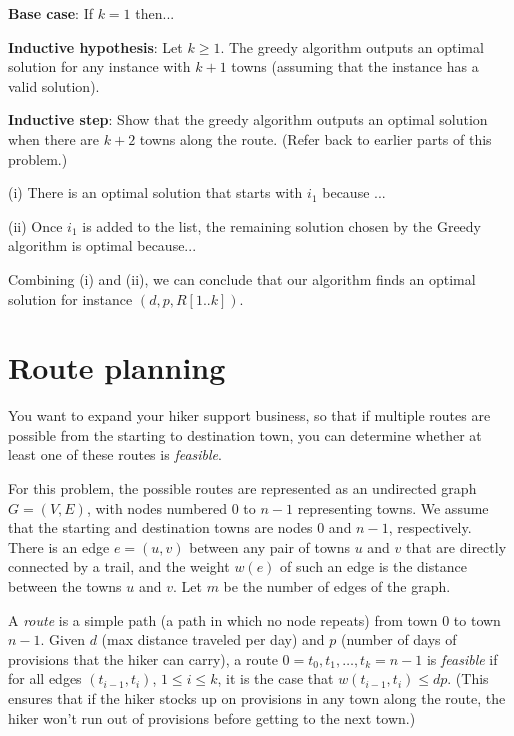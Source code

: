 \documentclass[11pt,fleqn]{exam}
\begin{document}
\begin{questions}
\noindent
{\bf Base case}: If $k = 1$ then...

\noindent
{\bf Inductive hypothesis}: Let $k\ge 1$.
The greedy algorithm outputs an optimal solution for any instance with $k+1$ towns (assuming that the instance has a valid solution).

\noindent
{\bf Inductive step}: Show that the greedy algorithm outputs an optimal
solution when there are $k+2$ towns along the route. (Refer back to earlier parts of this problem.)

(i) There is an optimal solution that starts with $i_1$ because ...

(ii) Once $i_1$ is added to the list, the remaining solution chosen by the Greedy algorithm is optimal because...

\vspace{.1in}

Combining (i) and (ii), we can conclude that our algorithm finds an optimal solution for instance
$(d,p,R[1..k])$.
\end{questions}

\clearpage
\section{Route planning}
You want to expand your hiker support business, so that if multiple routes
are possible from the starting to destination town, you can determine whether at least
one of these routes is {\em feasible}.

For this problem, the possible routes are represented as an undirected
graph $G=(V,E)$, with nodes numbered 0 to $n-1$ representing towns.  
We assume that the starting and destination towns are nodes $0$ and $n-1$, respectively.  
There is an edge $e=(u,v)$ between any
pair of towns $u$ and $v$ that are directly connected by a trail, and the weight $w(e)$ of such an edge is
the distance between the towns $u$ and $v$. Let $m$ be the number of edges of the graph.  

A {\em route} is a simple path (a path in
which no node repeats) from town 0 to town $n-1$.  Given $d$ (max
distance traveled per day) and $p$ (number of days of provisions that
the hiker can carry), a route $0=t_0, t_1, \ldots, t_k = n-1$
is {\em feasible} if for all edges $(t_{i-1}, t_i)$, $1 \le i \le k$, it is the case that
$w(t_{i-1}, t_i) \le dp$. 
(This ensures that if the hiker stocks up on provisions in any town along the route,
the hiker won't run out of provisions before getting to the next town.)
\end{document}
